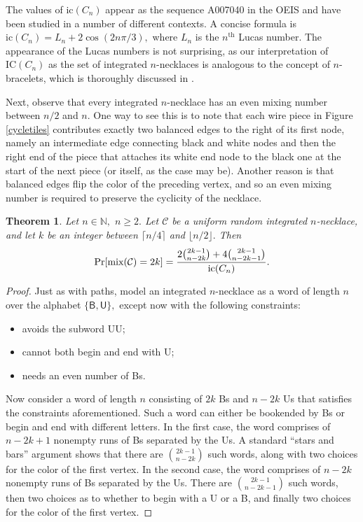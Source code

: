 \documentclass[11pt, reqno]{amsart}
\newtheorem{theorem}{Theorem} %
\theoremstyle{definition}
\renewcommand{\geq}{\geqslant}
\begin{document}
The values of $\text{ic}(C_n)$ appear as the sequence A007040 in the OEIS \cite{OEIS} and have been studied in a number of different contexts. A concise formula is $\text{ic}(C_n) = L_n + 2\cos(2n\pi/3),$ where $L_n$ is the $n^{\text{th}}$ Lucas number. The appearance of the Lucas numbers is not surprising, as our interpretation of $\text{IC}(C_n)$ as the set of integrated $n$-necklaces is analogous to the concept of $n$-bracelets, which is thoroughly discussed in \cite{BQ}.

Next, observe that every integrated $n$-necklace has an even mixing number between $n/2$ and $n.$ One way to see this is to note that each wire piece in Figure \ref{cycletiles} contributes exactly two balanced edges to the right of its first node, namely an intermediate edge connecting black and white nodes and then the right end of the piece that attaches its white end node to the black one at the start of the next piece (or itself, as the case may be). Another reason is that balanced edges flip the color of the preceding vertex, and so an even mixing number is required to preserve the cyclicity of the necklace.

\begin{theorem}
Let $n \in \mathbb{N},$ $n \geq 2.$ Let $\mathcal{C}$ be a uniform random integrated $n$-necklace, and let $k$ be an integer between $\lceil n/4 \rceil$ and $\lfloor n/2 \rfloor.$ Then
\[\textup{Pr}[\textup{mix}(\mathcal{C}) = 2k] = \frac{2\binom{2k-1}{n-2k} + 4\binom{2k-1}{n-2k-1}}{\textup{ic}(C_n)}.\]
\end{theorem}

\begin{proof}
Just as with paths, model an integrated $n$-necklace as a word of length $n$ over the alphabet $\{\textsf{B}, \textsf{U}\},$ except now with the following constraints:
\begin{itemize}
    \item avoids the subword \textsf{UU};
    \item cannot both begin and end with \textsf{U};
    \item needs an even number of \textsf{B}s.
\end{itemize}
Now consider a word of length $n$ consisting of $2k$ \textsf{B}s and $n - 2k$ \textsf{U}s that satisfies the constraints aforementioned. Such a word can either be bookended by \textsf{B}s or begin and end with different letters. In the first case, the word comprises of $n - 2k + 1$ nonempty runs of \textsf{B}s separated by the \textsf{U}s. A standard ``stars and bars'' argument shows that there are $\binom{2k - 1}{n - 2k}$ such words, along with two choices for the color of the first vertex. In the second case, the word comprises of $n - 2k$ nonempty runs of \textsf{B}s separated by the \textsf{U}s. There are $\binom{2k - 1}{n - 2k - 1}$ such words, then two choices as to whether to begin with a \textsf{U} or a \textsf{B}, and finally two choices for the color of the first vertex.
\end{proof}
\end{document}
